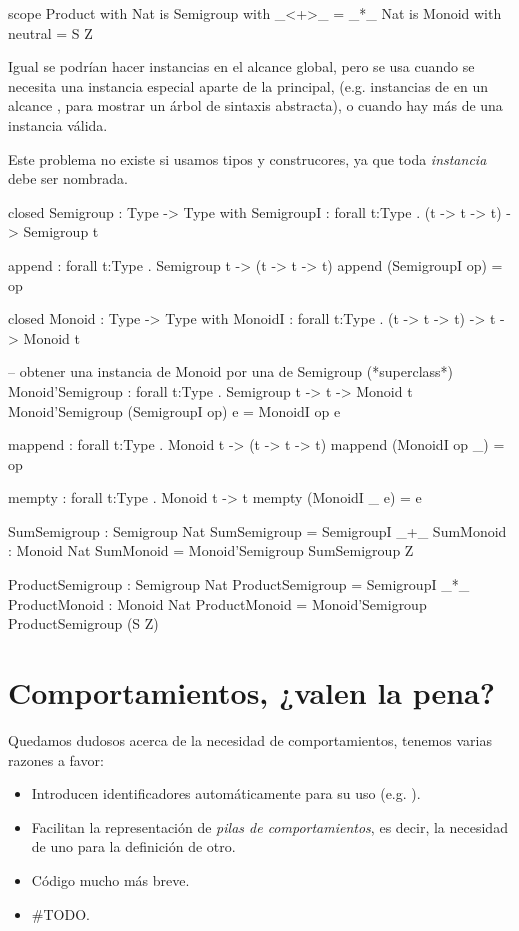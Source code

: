 {\begin{designfr}
\begin{anglercode}
scope Product with
    Nat is Semigroup with
        _<+>_ = _*_
    Nat is Monoid with
        neutral = S Z
\end{anglercode}

Igual se podrían hacer instancias en el alcance global, pero se usa cuando se necesita una instancia especial aparte de la principal, (e.g. instancias de  en un alcance , para mostrar un árbol de sintaxis abstracta), o cuando hay más de una instancia válida.

Este problema no existe si usamos tipos y construcores, ya que toda \emph{instancia} debe ser nombrada.

\begin{anglercode}
closed Semigroup : Type -> Type with
    SemigroupI : forall t:Type . (t -> t -> t) -> Semigroup t

append : forall t:Type . Semigroup t -> (t -> t -> t)
append (SemigroupI op) = op

closed Monoid : Type -> Type with
    MonoidI : forall t:Type . (t -> t -> t) -> t -> Monoid t

-- obtener una instancia de Monoid por una de Semigroup (*superclass*)
Monoid'Semigroup : forall t:Type . Semigroup t -> t -> Monoid t
Monoid'Semigroup (SemigroupI op) e = MonoidI op e

mappend : forall t:Type . Monoid t -> (t -> t -> t)
mappend (MonoidI op _) = op

mempty : forall t:Type . Monoid t -> t
mempty (MonoidI _ e) = e

SumSemigroup : Semigroup Nat
SumSemigroup = SemigroupI _+_
SumMonoid : Monoid Nat
SumMonoid = Monoid'Semigroup SumSemigroup Z

ProductSemigroup : Semigroup Nat
ProductSemigroup = SemigroupI _*_
ProductMonoid : Monoid Nat
ProductMonoid = Monoid'Semigroup ProductSemigroup (S Z)
\end{anglercode}
\end{designfr}

\section{Comportamientos, ¿valen la pena?}

\begin{designfr}
Quedamos dudosos acerca de la necesidad de comportamientos, tenemos varias razones a favor:

\begin{itemize}
    \item Introducen identificadores automáticamente para su uso (e.g. ).
    \item Facilitan la representación de \emph{pilas de comportamientos}, es decir, la necesidad de uno para la definición de otro.
    \item Código mucho más breve.
    \item \#TODO.
\end{itemize}


\end{designfr}}
